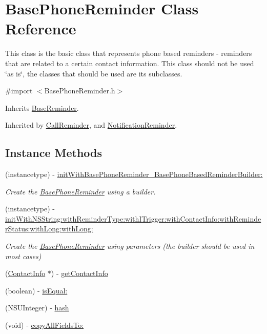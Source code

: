 \hypertarget{interface_base_phone_reminder}{}\section{Base\+Phone\+Reminder Class Reference}
\label{interface_base_phone_reminder}


This class is the basic class that represents phone based reminders -\/ reminders that are related to a certain contact information. This class should not be used \char`\"{}as is\char`\"{}, the classes that should be used are it\textquotesingle{}s subclasses.  




{\ttfamily \#import $<$Base\+Phone\+Reminder.\+h$>$}



Inherits \hyperlink{interface_base_reminder}{Base\+Reminder}.



Inherited by \hyperlink{interface_call_reminder}{Call\+Reminder}, and \hyperlink{interface_notification_reminder}{Notification\+Reminder}.

\subsection*{Instance Methods}
\begin{DoxyCompactItemize}
\item 
(instancetype) -\/ \hyperlink{interface_base_phone_reminder_aeab8c1cc3bc492eabdd394bab7e28a21}{init\+With\+Base\+Phone\+Reminder\+\_\+\+Base\+Phone\+Based\+Reminder\+Builder\+:}
\begin{DoxyCompactList}\small\item\em Create the \hyperlink{interface_base_phone_reminder}{Base\+Phone\+Reminder} using a builder. \end{DoxyCompactList}\item 
(instancetype) -\/ \hyperlink{interface_base_phone_reminder_a4812344ea9cf4b468ecf286586a35ac4}{init\+With\+N\+S\+String\+:with\+Reminder\+Type\+:with\+I\+Trigger\+:with\+Contact\+Info\+:with\+Reminder\+Status\+:with\+Long\+:with\+Long\+:}
\begin{DoxyCompactList}\small\item\em Create the \hyperlink{interface_base_phone_reminder}{Base\+Phone\+Reminder} using parameters (the builder should be used in most cases) \end{DoxyCompactList}\item 
(\hyperlink{interface_contact_info}{Contact\+Info} $\ast$) -\/ \hyperlink{interface_base_phone_reminder_a8e5c3b391f06426eaa80e142c296c0e1}{get\+Contact\+Info}
\item 
(boolean) -\/ \hyperlink{interface_base_phone_reminder_a5ff1630c1cf6e5b5ab8e0e0b096b7c02}{is\+Equal\+:}
\item 
(N\+S\+U\+Integer) -\/ \hyperlink{interface_base_phone_reminder_ab99a4ca85cea17115f96b81f65486481}{hash}
\item 
(void) -\/ \hyperlink{interface_base_phone_reminder_ad01e341a825e06f241fdcc660be4d84f}{copy\+All\+Fields\+To\+:}
\end{DoxyCompactItemize}
